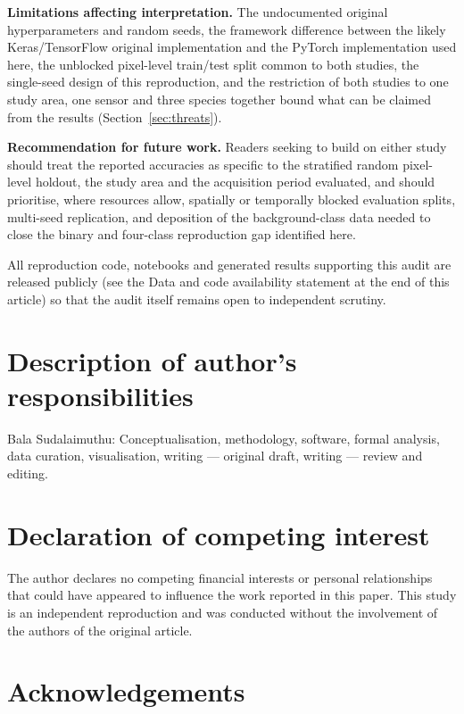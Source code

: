\documentclass[10pt,twocolumn,a4paper]{article}
\begin{document}
\textbf{Limitations affecting interpretation.} The undocumented original hyperparameters and random
seeds, the framework difference between the likely Keras/TensorFlow original implementation and the
PyTorch implementation used here, the unblocked pixel-level train/test split common to both studies,
the single-seed design of this reproduction, and the restriction of both studies to one study area,
one sensor and three species together bound what can be claimed from the results
(Section~\ref{sec:threats}).

\textbf{Recommendation for future work.} Readers seeking to build on either study should treat the
reported accuracies as specific to the stratified random pixel-level holdout, the study area and the
acquisition period evaluated, and should prioritise, where resources allow, spatially or temporally
blocked evaluation splits, multi-seed replication, and deposition of the background-class data
needed to close the binary and four-class reproduction gap identified here.

All reproduction code, notebooks and generated results supporting this audit are released publicly
(see the Data and code availability statement at the end of this article) so that the audit itself
remains open to independent scrutiny.

\section*{Description of author's responsibilities}

\noindent Bala Sudalaimuthu: Conceptualisation, methodology, software, formal analysis, data
curation, visualisation, writing --- original draft, writing --- review and editing.

\section*{Declaration of competing interest}

The author declares no competing financial interests or personal relationships that could have
appeared to influence the work reported in this paper. This study is an independent reproduction
and was conducted without the involvement of the authors of the original article.

\section*{Acknowledgements}
\end{document}
